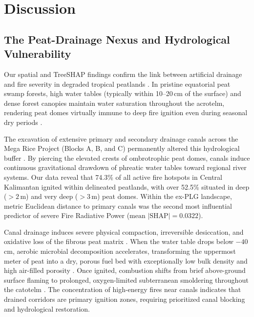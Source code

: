 \section{Discussion}
\label{sec:discussion}

\subsection{The Peat-Drainage Nexus and Hydrological Vulnerability}
\label{subsec:disc_nexus}

Our spatial and TreeSHAP findings confirm the link between artificial drainage and fire severity in degraded tropical peatlands \citep{Hooijer2012Biogeosciences, Ritzema2014HESS}. In pristine equatorial peat swamp forests, high water tables (typically within 10--20\,cm of the surface) and dense forest canopies maintain water saturation throughout the acrotelm, rendering peat domes virtually immune to deep fire ignition even during seasonal dry periods \citep{Wosten2008Geoderma, Dadap2021NatComm}. 

The excavation of extensive primary and secondary drainage canals across the Mega Rice Project (Blocks A, B, and C) permanently altered this hydrological buffer \citep{Silvius2005Wetlands, Ritzema2014HESS}. By piercing the elevated crests of ombrotrophic peat domes, canals induce continuous gravitational drawdown of phreatic water tables toward regional river systems. Our data reveal that 74.3\% of all active fire hotspots in Central Kalimantan ignited within delineated peatlands, with over 52.5\% situated in deep ($>2$\,m) and very deep ($>3$\,m) peat domes. Within the ex-PLG landscape, metric Euclidean distance to primary canals was the second most influential predictor of severe Fire Radiative Power ($\text{mean } |\text{SHAP}| = 0.0322$).

Canal drainage induces severe physical compaction, irreversible desiccation, and oxidative loss of the fibrous peat matrix \citep{Hooijer2012Biogeosciences, Graham2022SciRep}. When the water table drops below $-40$\,cm, aerobic microbial decomposition accelerates, transforming the uppermost meter of peat into a dry, porous fuel bed with exceptionally low bulk density and high air-filled porosity \citep{Usup2004Tropics}. Once ignited, combustion shifts from brief above-ground surface flaming to prolonged, oxygen-limited subterranean smoldering throughout the catotelm \citep{Wooster2018NatGeosci, Vetrita2020RemoteSensing}. The concentration of high-energy fires near canals indicates that drained corridors are primary ignition zones, requiring prioritized canal blocking and hydrological restoration.

